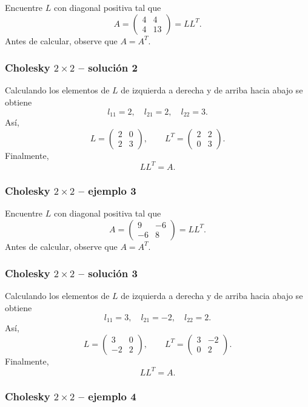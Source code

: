 Encuentre $L$ con diagonal positiva tal que
\[
A=\begin{pmatrix}4 & 4\\4 & 13\end{pmatrix}=LL^T.
\]
Antes de calcular, observe que $A=A^T$.


\subsubsection*{Cholesky $2\times 2$ -- solución 2}

Calculando los elementos de $L$ de izquierda a derecha y de arriba hacia abajo se obtiene
\[
l_{11}=2,\quad l_{21}=2,\quad l_{22}=3.
\]
Así,
\[
L=\begin{pmatrix}2 & 0\\2 & 3\end{pmatrix},\qquad L^T=\begin{pmatrix}2 & 2\\0 & 3\end{pmatrix}.
\]
Finalmente,
\[
\boxed{LL^T=A}.
\]


\subsubsection*{Cholesky $2\times 2$ -- ejemplo 3}

Encuentre $L$ con diagonal positiva tal que
\[
A=\begin{pmatrix}9 & -6\\-6 & 8\end{pmatrix}=LL^T.
\]
Antes de calcular, observe que $A=A^T$.


\subsubsection*{Cholesky $2\times 2$ -- solución 3}

Calculando los elementos de $L$ de izquierda a derecha y de arriba hacia abajo se obtiene
\[
l_{11}=3,\quad l_{21}=-2,\quad l_{22}=2.
\]
Así,
\[
L=\begin{pmatrix}3 & 0\\-2 & 2\end{pmatrix},\qquad L^T=\begin{pmatrix}3 & -2\\0 & 2\end{pmatrix}.
\]
Finalmente,
\[
\boxed{LL^T=A}.
\]


\subsubsection*{Cholesky $2\times 2$ -- ejemplo 4}

